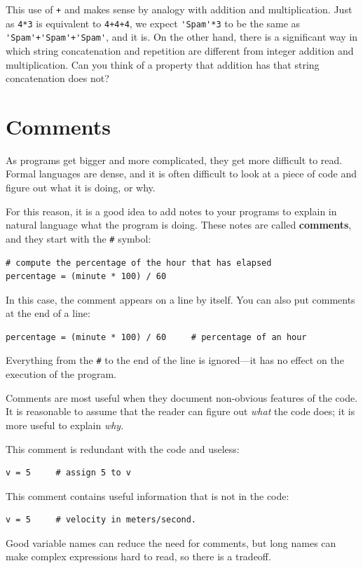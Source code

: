 \documentclass[10pt]{book}
\begin{document}
This use of {\tt +} and {\tt *} makes sense by
analogy with addition and multiplication.  Just as {\tt 4*3} is
equivalent to {\tt 4+4+4}, we expect \verb"'Spam'*3" to be the same as
\verb"'Spam'+'Spam'+'Spam'", and it is.  On the other hand, there is a
significant way in which string concatenation and repetition are
different from integer addition and multiplication.
Can you think of a property that addition has
that string concatenation does not?


\section{Comments}

As programs get bigger and more complicated, they get more difficult
to read.  Formal languages are dense, and it is often difficult to
look at a piece of code and figure out what it is doing, or why.

For this reason, it is a good idea to add notes to your programs to explain
in natural language what the program is doing.  These notes are called
{\bf comments}, and they start with the \verb"#" symbol:

\begin{verbatim}
# compute the percentage of the hour that has elapsed
percentage = (minute * 100) / 60
\end{verbatim}
%
In this case, the comment appears on a line by itself.  You can also put
comments at the end of a line:

\begin{verbatim}
percentage = (minute * 100) / 60     # percentage of an hour
\end{verbatim}
%
Everything from the {\tt \#} to the end of the line is ignored---it
has no effect on the execution of the program.

Comments are most useful when they document non-obvious features of
the code.  It is reasonable to assume that the reader can figure out
{\em what} the code does; it is more useful to explain {\em why}.

This comment is redundant with the code and useless:

\begin{verbatim}
v = 5     # assign 5 to v
\end{verbatim}
%
This comment contains useful information that is not in the code:

\begin{verbatim}
v = 5     # velocity in meters/second. 
\end{verbatim}
%
Good variable names can reduce the need for comments, but
long names can make complex expressions hard to read, so there is
a tradeoff.
\end{document}

